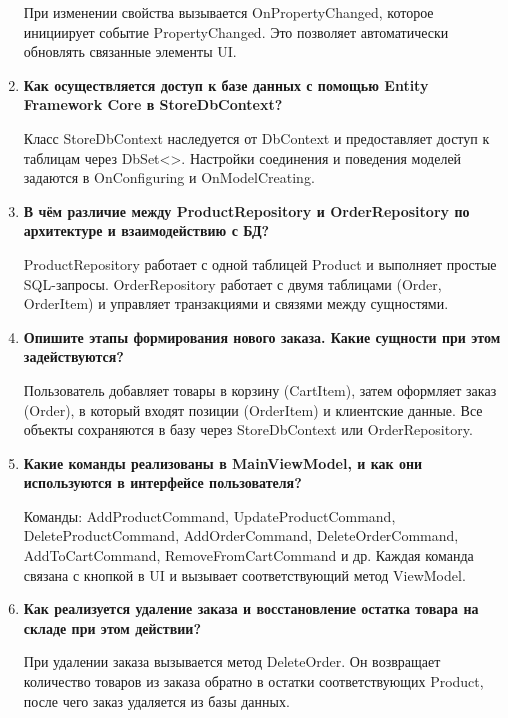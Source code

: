\documentclass[12pt]{article}
\renewcommand{\texttt}[1]{{\small\ttfamily #1}}
\numberwithin{listing}{section}
\numberwithin{figure}{section}
\begin{document}
\begin{enumerate}
	      При изменении свойства вызывается \texttt{OnPropertyChanged}, которое инициирует событие \texttt{Proper\-tyChanged}. Это позволяет автоматически обновлять связанные элементы UI.

	\item \textbf{Как осуществляется доступ к базе данных с помощью Entity Framework Core в \texttt{StoreDb\-Context}?}

	      Класс \texttt{StoreDbContext} наследуется от \texttt{DbContext} и предоставляет доступ к таблицам через \texttt{DbSet<>}. Настройки соединения и поведения моделей задаются в \texttt{OnConfiguring} и \texttt{OnModel\-Creating}.

	\item \textbf{В чём различие между \texttt{ProductRepository} и \texttt{OrderRepository} по архитектуре и взаимодействию с БД?}

	      \texttt{ProductRepository} работает с одной таблицей \texttt{Product} и выполняет простые SQL-запросы. \texttt{OrderRepository} работает с двумя таблицами (\texttt{Order}, \texttt{OrderItem}) и управляет транзакциями и связями между сущностями.

	\item \textbf{Опишите этапы формирования нового заказа. Какие сущности при этом задействуются?}

	      Пользователь добавляет товары в корзину (\texttt{CartItem}), затем оформляет заказ (\texttt{Order}), в который входят позиции (\texttt{OrderItem}) и клиентские данные. Все объекты сохраняются в базу через \texttt{StoreDbContext} или \texttt{OrderRepository}.

	\item \textbf{Какие команды реализованы в \texttt{MainViewModel}, и как они используются в интерфейсе пользователя?}

	      Команды: \texttt{AddProductCommand}, \texttt{UpdateProductCommand}, \texttt{DeleteProductCommand}, \texttt{AddOrderCommand}, \texttt{DeleteOrderCommand}, \texttt{AddToCartCommand}, \texttt{RemoveFromCartCommand} и др. Каждая команда связана с кнопкой в UI и вызывает соответствующий метод ViewModel.

	\item \textbf{Как реализуется удаление заказа и восстановление остатка товара на складе при этом действии?}

	      При удалении заказа вызывается метод \texttt{DeleteOrder}. Он возвращает количество товаров из заказа обратно в остатки соответствующих \texttt{Product}, после чего заказ удаляется из базы данных.
\end{enumerate}
\end{document}
